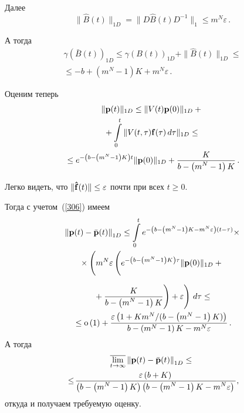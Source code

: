 \begin{multicols}{2}
Далее
\begin{equation*}
\|\hat{B}(t)\|_{1D}=\|D\hat{B}(t)D^{-1}\|_{1} \le  m^N\varepsilon\,.
\end{equation*}

А тогда
\begin{multline*}
\gamma(\bar{B}(t))_{1D} \le \gamma(B(t))_{1D}+\|\hat{B}(t)\|_{1D}  \le{}\\
{}\le -b + \left(m^N-1\right)K + m^N\varepsilon\,.
\end{multline*}

Оценим теперь
\begin{multline*}
\|{\bf p}(t)\|_{1D} \le
\|V(t){\bf p}(0) \|_{1D} +{}\\
{}+
 \int\limits_0^t \| V(t,\tau){\bf f}(\tau)\, d\tau \|_{1D } \le {} \\
{}\le e^{-\left(b - \left(m^N-1\right)K\right)t}\|{\bf p}(0) \|_{1D} +  
\displaystyle\frac{\displaystyle K\mathstrut}{\displaystyle b - \left(m^N-1\right)K\mathstrut}\,.
\end{multline*}

Легко видеть, что $\|{\bf \hat{f}}(t)\| \hm\le \varepsilon$ почти при всех $t\ge 0$.

Тогда с учетом~(\ref{306}) имеем
\begin{multline*}
\left\|\mathbf {p}(t)-\bar{\mathbf {p}}(t)\right\|_{1D} \le \int\limits_0^t e^{-\left(b - \left(m^N-1\right)K - m^N\varepsilon\right)\left(t-\tau\right)}\times \\
{}\times\left(
\vphantom{\fr{K}{b - \left(m^N-1\right)K}}
m^N\varepsilon\left(\vphantom{\fr{K}{b - \left(m^N-1\right)K}}
e^{-\left(b - \left(m^N-1\right)K\right)\tau}\|{\bf p}(0) 
\|_{1D} + {}\right.\right.
\end{multline*}

\noindent
\begin{multline*}
\left.\left.{}+ \displaystyle\frac{\displaystyle K\mathstrut}{\displaystyle b - \left(m^N-1\right)K\mathstrut}\right) + \varepsilon\right)\, d\tau  \le {}\\ 
{}\le\mbox {o} \left(1\right)+ \frac{\varepsilon\left(1+  {Km^N}/({b - \left(m^N-1\right)K})\right)}{b - \left(m^N-1\right)K - m^N\varepsilon}\,.
\end{multline*}
А тогда
\begin{multline*}
\overline{\lim_{t \to \infty}} \left\|\mathbf {p}(t)-\bar{\mathbf {p}}(t)\right\|_{1D} \le{}\\
\!\!\!\!{}\le\! \fr{\varepsilon\left(b+K\right)}{\left(b - \left(m^N-1\right)K\right)\left(b - \left(m^N-1\right)K- m^N\varepsilon\right)},\!\!\!\!
\end{multline*}
откуда и получаем требуемую оценку.


\end{multicols}
